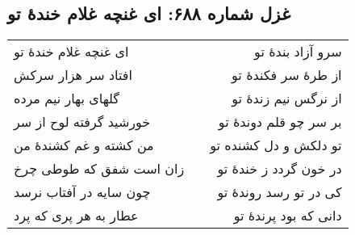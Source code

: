 \begin{center}
\section*{غزل شماره ۶۸۸: ای غنچه غلام خندهٔ تو}
\label{sec:688}
\begin{longtable}{l p{0.5cm} r}
ای غنچه غلام خندهٔ تو
&&
سرو آزاد بندهٔ تو
\\
افتاد سر هزار سرکش
&&
از طرهٔ سر فکندهٔ تو
\\
گلهای بهار نیم مرده
&&
از نرگس نیم زندهٔ تو
\\
خورشید گرفته لوح از سر
&&
بر سر چو قلم دوندهٔ تو
\\
من کشته و غم کشندهٔ من
&&
تو دلکش و دل کشنده تو
\\
زان است شفق که طوطی چرخ
&&
در خون گردد ز خندهٔ تو
\\
چون سایه در آفتاب نرسد
&&
کی در تو رسد روندهٔ تو
\\
عطار به هر پری که پرد
&&
دانی که بود پرندهٔ تو
\\
\end{longtable}
\end{center}
